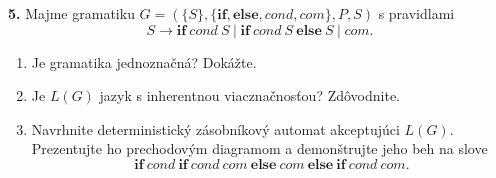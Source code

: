 \documentclass[12pt]{article}
\newcommand{\task}[2]{\par \noindent \textbf{{#1}.} \hspace{3pt} #2 \vspace{10pt}}
\newcommand{\pipesep}{\hspace{3pt} \vert \hspace{3pt}}
\newenvironment{subtasklist}[0]{\begin{enumerate}[label=(\alph*)]}{\end{enumerate}}
\begin{document}
\task{5}{Majme gramatiku $G = (\{S\},\{\textbf{if},\textbf{else},cond,com\},P,S)$ s pravidlami
\begin{equation*}
	S \to \textbf{if}\ cond\ S \pipesep \textbf{if}\ cond\ S\ \textbf{else}\ S \pipesep com .
\end{equation*}
\begin{subtasklist}
	\item Je gramatika jednoznačná? Dokážte.
	\item Je $L(G)$ jazyk s inherentnou viacznačnosťou? Zdôvodnite.
	\item Navrhnite deterministický zásobníkový automat akceptujúci $L(G)$. Prezentujte ho
		prechodovým diagramom a demonštrujte jeho beh na slove
	\begin{equation*}
	\textbf{if}\ cond\ \textbf{if}\ cond\ com\ \textbf{else}\ com\ \textbf{else}\ 
	\textbf{if}\ cond\ com.
	\end{equation*}
\end{subtasklist}}
\end{document}
